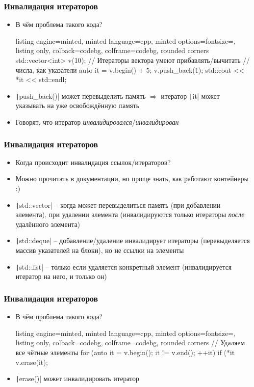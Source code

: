 \documentclass[10pt]{beamer}
\begin{document}
\begin{frame}[fragile]
\frametitle{Инвалидация итераторов}
\begin{itemize}
\item В чём проблема такого кода?
\begin{tcblisting}{listing engine=minted, minted language=cpp, minted options={fontsize=\scriptsize}, listing only, colback=codebg, colframe=codebg, rounded corners}
std::vector<int> v(10);
// Итераторы вектора умеют прибавлять/вычитать
// числа, как указатели
auto it = v.begin() + 5;
v.push_back(1);
std::cout << *it << std::endl;
\end{tcblisting}
\pause
{}
\item \texttt|push_back()| может перевыделить память \(\Longrightarrow\) итератор \texttt|it| может указывать на уже освобождённую память
\pause
\item Говорят, что итератор \textit{инвалидировался}/\textit{инвалидирован}
\end{itemize}
\end{frame}

\begin{frame}[fragile]
\frametitle{Инвалидация итераторов}
\begin{itemize}
\item Когда происходит инвалидация ссылок/итераторов?
\pause
\item Можно прочитать в документации\pause, но проще знать, как работают контейнеры :)
\pause
\item \texttt|std::vector| -- когда может перевыделиться память (при добавлении элемента), при удалении элемента (инвалидируются только итераторы \textit{после} удалённого элемента)
\pause
\item \texttt|std::deque| -- добавление/удаление инвалидирует итераторы (перевыделяется массив указателей на блоки), но не ссылки на элементы
\pause
\item \texttt|std::list| -- только если удаляется конкретный элемент (инвалидируется итератор на него, и только он)
\end{itemize}
\end{frame}

\begin{frame}[fragile]
\frametitle{Инвалидация итераторов}
\begin{itemize}
\item В чём проблема такого кода?
\begin{tcblisting}{listing engine=minted, minted language=cpp, minted options={fontsize=\scriptsize}, listing only, colback=codebg, colframe=codebg, rounded corners}
// Удаляем все чётные элементы
for (auto it = v.begin(); it != v.end(); ++it)
  if (*it %
    v.erase(it);
\end{tcblisting}
\pause
{}
\item \texttt|erase()| может инвалидировать итератор
\end{itemize}
\end{frame}
\end{document}
